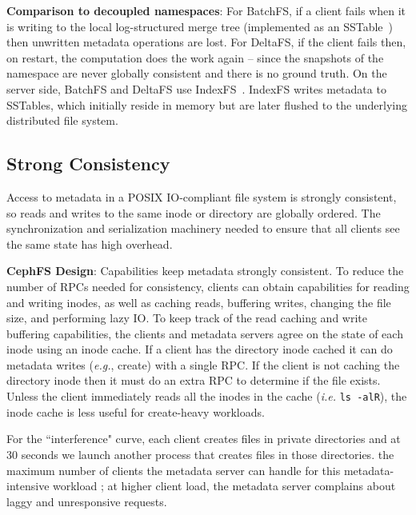 \textbf{Comparison to decoupled namespaces}: For BatchFS, if a client fails
when it is writing to the local log-structured merge tree (implemented as an
SSTable~\cite{ren:atc2013-tablefs}) then unwritten metadata operations are
lost. For DeltaFS, if the client fails then, on restart, the computation does
the work again -- since the snapshots of the namespace are never globally
consistent and there is no ground truth.  On the server side, BatchFS and
DeltaFS use IndexFS~\cite{ren:sc2014-indexfs}. IndexFS writes metadata to
SSTables, which initially reside in memory but are later flushed to the
underlying distributed file system.

\subsection{Strong Consistency}
\label{sec:strong-consistency}

Access to metadata in a POSIX IO-compliant file system is strongly consistent, so
reads and writes to the same inode or directory are globally ordered.  The
synchronization and serialization machinery needed to ensure that all clients
see the same state has high overhead.


\textbf{CephFS Design}: Capabilities keep metadata strongly consistent. To
reduce the number of RPCs needed for consistency, clients can obtain
capabilities for reading and writing inodes, as well as caching reads,
buffering writes, changing the file size, and performing lazy IO.  To keep
track of the read caching and write buffering capabilities, the clients and
metadata servers agree on the state of each inode using an inode cache.  If a
client has the directory inode cached it can do metadata writes ({\it e.g.},
create) with a single RPC. If the client is not caching the directory inode
then it must do an extra RPC to determine if the file exists.  Unless the
client immediately reads all the inodes in the cache ({\it i.e.} \texttt{ls
-alR}), the inode cache is less useful for create-heavy workloads.

 For the ``interference"
curve, each client creates files in private directories and at 30 seconds we
launch another process that creates files in those directories.  the maximum number of
clients the metadata server can handle for this metadata-intensive workload
; at higher client load, the metadata server
complains about laggy and unresponsive requests.

